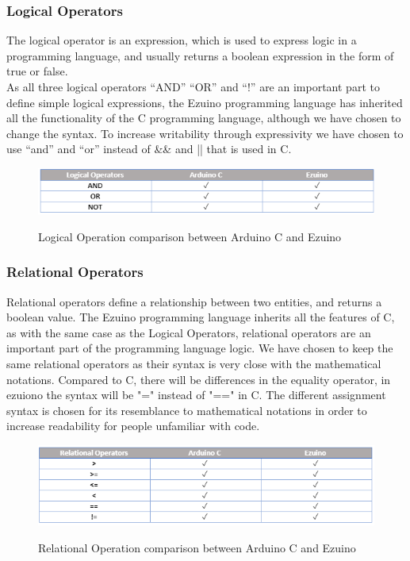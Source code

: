\subsubsection*{Logical Operators}
The logical operator is an expression, which is used to express logic in a programming language, and usually returns a boolean expression in the form of true or false. \\
As all three logical operators “AND” “OR” and “!” are an important part to define simple logical expressions, the Ezuino programming language has inherited all the functionality of the C programming language, although we have chosen to change the syntax. To increase writability through expressivity we have chosen to use “and” and “or” instead of \&\& and || that is used in C.\\
\begin{figure}[H]
\centering
\caption{Logical Operation comparison between Arduino C and Ezuino}
\includegraphics[scale=0.60]{figures/language_features/langf03.png}
\label{lf03}
\end{figure}
\subsubsection*{Relational Operators}
Relational operators define a relationship between two entities, and returns a boolean value.
The Ezuino programming language inherits all the features of C, as with the same case as the Logical Operators, relational operators are an important part of the programming language logic. We have chosen to keep the same relational operators as their syntax is very close with the mathematical notations. Compared to C, there will be differences in the equality operator, in ezuiono the syntax will be "=" instead of "==" in C. The different assignment syntax is chosen for its resemblance to mathematical notations in order to increase readability for people unfamiliar with code.
\begin{figure}[H]
\centering
\caption{Relational Operation comparison between Arduino C and Ezuino}
\includegraphics[scale=0.60]{figures/language_features/langf04.png}
\label{lf04}
\end{figure}

